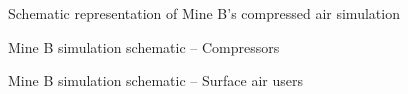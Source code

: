 \begin{appendices}
	\begin{figure}[h!]
		\centering
		\caption{Schematic representation of Mine B's compressed air simulation}
		\label{fig: KUS Baseline model}
	\end{figure}
	\clearpage
	\begin{figure}[h!]
		\centering
		\caption{Mine B simulation schematic -- Compressors}
		\label{fig: KUS compressors model}
	\end{figure}
\hspace{1cm}
\begin{figure}[h!]
	\centering
	\caption{Mine B simulation schematic -- Surface air users}
	\label{fig: KUS surface model}
\end{figure}
\clearpage

\end{appendices}
